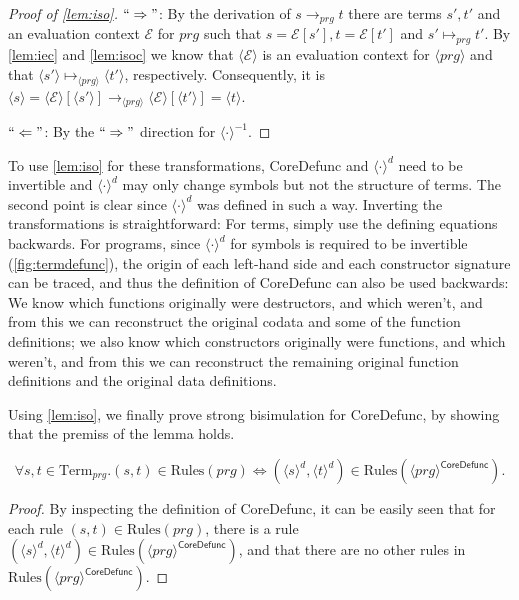\begin{proof}[Proof of \autoref{lem:iso}]
$``\Rightarrow"$: By the derivation of $s \longrightarrow_{prg} t$ there are terms $s', t'$ and an evaluation context $\mathcal{E}$ for $prg$ such that $s = \mathcal{E}[s'], t = \mathcal{E}[t']$ and $s' \mapsto_{prg} t'$. By \autoref{lem:iec} and \autoref{lem:isoc} we know that $\langle \mathcal{E} \rangle$ is an evaluation context for $\langle prg \rangle$ and that $\langle s' \rangle \mapsto_{\langle prg \rangle} \langle t' \rangle$, respectively. Consequently, it is $\langle s \rangle = \langle \mathcal{E} \rangle [\langle s' \rangle] \longrightarrow_{\langle prg \rangle} \langle \mathcal{E} \rangle [\langle t' \rangle] = \langle t \rangle$.

$``\Leftarrow"$: By the $``\Rightarrow"$ direction for $\langle \cdot \rangle^{-1}$.
\end{proof}

To use \autoref{lem:iso} for these transformations, \textsf{CoreDefunc} and $\langle \cdot \rangle^d$ need to be invertible and $\langle \cdot \rangle^d$ may only change symbols but not the structure of terms. The second point is clear since $\langle \cdot \rangle^d$ was defined in such a way. Inverting the transformations is straightforward: For terms, simply use the defining equations backwards. For programs, since $\langle \cdot \rangle^d$ for symbols is required to be invertible (\autoref{fig:termdefunc}), the origin of each left-hand side and each constructor signature can be traced, and thus the definition of \textsf{CoreDefunc} can also be used backwards: We know which functions originally were destructors, and which weren't, and from this we can reconstruct the original codata and some of the function definitions; we also know which constructors originally were functions, and which weren't, and from this we can reconstruct the remaining original function definitions and the original data definitions.

Using \autoref{lem:iso}, we finally prove strong bisimulation for \textsf{CoreDefunc}, by showing that the premiss of the lemma holds.

\begin{lemma}
\label{lem:sbruld}
\[
\forall s,t \in \textrm{Term}_{prg}. (s, t) \in \textrm{Rules}(prg) \iff (\langle s \rangle^d, \langle t \rangle^d) \in \textrm{Rules}(\langle prg \rangle^{\textsf{CoreDefunc}}).
\]
\begin{proof}
By inspecting the definition of \textsf{CoreDefunc}, it can be easily seen that for each rule $(s, t) \in \textrm{Rules}(prg)$, there is a rule $(\langle s \rangle^d, \langle t \rangle^d) \in \textrm{Rules}(\langle prg \rangle^{\textsf{CoreDefunc}})$, and that there are no other rules in $\textrm{Rules}(\langle prg \rangle^{\textsf{CoreDefunc}})$.
\end{proof}
\end{lemma}

